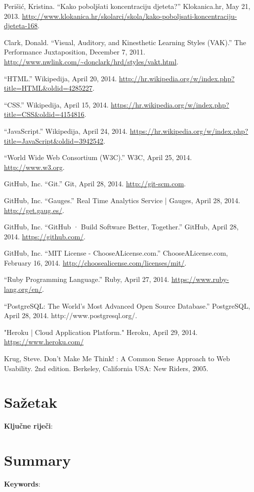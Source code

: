 \documentclass{scrreprt}
\begin{document}
\begin{thebibliography}{99}

  \raggedright

   Perišić, Kristina. “Kako poboljšati koncentraciju djeteta?”
    Klokanica.hr, May 21, 2013.
    \url{http://www.klokanica.hr/skolarci/skola/kako-poboljsati-koncentraciju-djeteta-168}.

   Clark, Donald. “Visual, Auditory, and Kinesthetic Learning
    Styles (VAK).” The Performance Juxtaposition, December 7, 2011.
    \url{http://www.nwlink.com/~donclark/hrd/styles/vakt.html}.

   “HTML.” Wikipedija, April 20, 2014.
    \url{http://hr.wikipedia.org/w/index.php?title=HTML&oldid=4285227}.

   “CSS.” Wikipedija, April 15, 2014.
    \url{https://hr.wikipedia.org/w/index.php?title=CSS&oldid=4154816}.

   “JavaScript.” Wikipedija, April 24, 2014.
    \url{https://hr.wikipedia.org/w/index.php?title=JavaScript&oldid=3942542}.

   “World Wide Web Consortium (W3C).” W3C, April 25, 2014.
    \url{http://www.w3.org}.

   GitHub, Inc. “Git.” Git, April 28, 2014.
    \url{http://git-scm.com}.

   GitHub, Inc. “Gauges.” Real Time Analytics Service | Gauges,
    April 28, 2014. \url{http://get.gaug.es/}.

   GitHub, Inc. “GitHub · Build Software Better, Together.”
    GitHub, April 28, 2014. \url{https://github.com/}.

   GitHub, Inc. “MIT License - ChooseALicense.com.”
    ChooseALicense.com, February 16, 2014.
    \url{http://choosealicense.com/licenses/mit/}.

   “Ruby Programming Language.” Ruby, April 27, 2014.
    \url{https://www.ruby-lang.org/en/}.

   “PostgreSQL: The World’s Most Advanced Open Source
    Database.” PostgreSQL, April 28, 2014. http://www.postgresql.org/.

   "Heroku | Cloud Application Platform." Heroku, April 29,
    2014. \url{https://www.heroku.com/}

   Krug, Steve. Don't Make Me Think! : A Common Sense Approach
    to Web Usability. 2nd edition. Berkeley, California USA: New Riders, 2005.

\end{thebibliography}

\chapter{Sažetak}

\textbf{Ključne riječi}:

\chapter{Summary}

\textbf{Keywords}:
\end{document}
